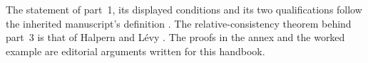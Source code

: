 The statement of part~1, its displayed conditions and its two qualifications
follow the inherited manuscript's definition
\cite[ch.~``Sets, Relations, Functions, and Cardinality'', sec.~``Choice
principles used later'', definition ``Ultrafilter Lemma'']{FrozenFormalLogicUltrafilterLemma}.
The relative-consistency theorem behind part~3 is that of Halpern and L\'evy
\cite{HalpernLevy1971}. The proofs in the annex and the worked example are
editorial arguments written for this handbook.
